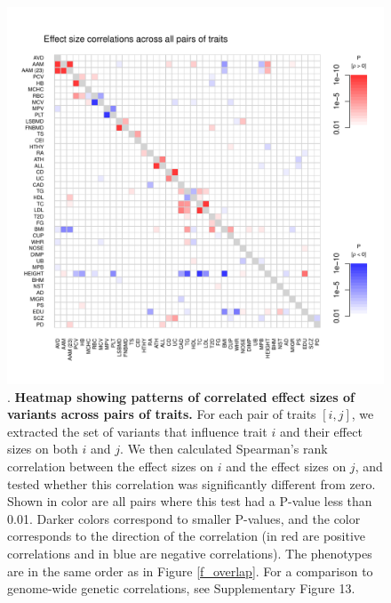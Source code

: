 \documentclass[11pt,titlepage]{article}
\begin{document}
\begin{figure}
\begin{center}
\includegraphics[scale = 0.8]{figs/heatmap_betas.pdf}
\caption{. \textbf{Heatmap showing patterns of correlated effect sizes of variants across pairs of traits.} For each pair of traits $[i,j]$, we extracted the set of variants that influence trait $i$ and their effect sizes on both $i$ and $j$. We then calculated Spearman's rank correlation between the effect sizes on $i$ and the effect sizes on $j$, and tested whether this correlation was significantly different from zero. Shown in color are all pairs where this test had a P-value less than 0.01. Darker colors correspond to smaller P-values, and the color corresponds to the direction of the correlation (in red are positive correlations and in blue are negative correlations). The phenotypes are in the same order as in Figure \ref{f_overlap}. For a comparison to genome-wide genetic correlations, see Supplementary Figure 13.}\label{f_corr}
\end{center}
\end{figure}
\end{document}
